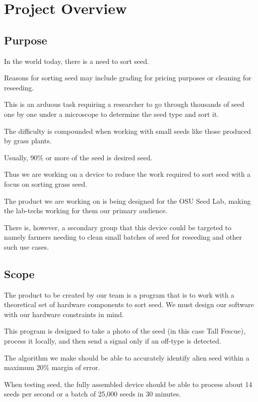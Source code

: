 \documentclass[onecolumn, draftclsnofoot,10pt, compsoc]{IEEEtran}
\begin{document}
	\section{Project Overview}
	
	\subsection{Purpose}
	
	In the world today, there is a need to sort seed.
	
	Reasons for sorting seed may include grading for pricing purposes or cleaning for reseeding. 
	
	This is an arduous task requiring a researcher to go through thousands of seed one by one under a microscope to determine the seed type and sort it.
	
	The difficulty is compounded when working with small seeds like those produced by grass plants.
	
	Usually, 90\% or more of the seed is desired seed.
	
	Thus we are working on a device to reduce the work required to sort seed with a focus on sorting grass seed.
	
	The product we are working on is being designed for the OSU Seed Lab, making the lab-techs working for them our primary audience.
	
	There is, however, a secondary group that this device could be targeted to namely farmers needing to clean small batches of seed for reseeding and other such use cases.
	
	
	
	\subsection{Scope}
	
	The product to be created by our team is a program that is to work with a theoretical set of hardware components to sort seed. We must design our software with our hardware constraints in mind. 
	
	This program is designed to take a photo of the seed (in this case Tall Fescue), process it locally, and then send a signal only if an off-type is detected.
	
	The algorithm we make should be able to accurately identify alien seed within a maximum 20\% margin of error.
	
	When testing seed, the fully assembled device should be able to process about 14 seeds per second or a batch of 25,000 seeds in 30 minutes. 
	
\end{document}
